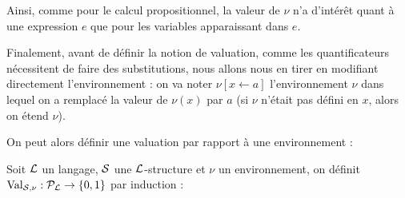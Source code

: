 Ainsi, comme pour le calcul propositionnel, la valeur de $\nu$ n'a d'intérêt quant à une expression $e$ que pour les variables apparaissant dans $e$.

Finalement, avant de définir la notion de valuation, comme les quantificateurs nécessitent de faire des substitutions, nous allons nous en tirer en modifiant directement l'environnement : on va noter $\nu[x \leftarrow a]$ l'environnement $\nu$ dans lequel on a remplacé la valeur de $\nu(x)$ par $a$ (si $\nu$ n'était pas défini en $x$, alors on étend $\nu$).

On peut alors définir une valuation par rapport à une environnement :

\begin{defi}[Valuation]
    Soit $\LL$ un langage, $\sS$ une $\LL$-structure et $\nu$ un environnement, on définit $\valu_{\sS,\nu} : \mathcal P_\LL \to \{0,1\}$ par induction :
    \begin{center}
        \begin{prooftree}
        \end{prooftree}
        \quad
        \begin{prooftree}
        \end{prooftree}
        \quad
        \begin{prooftree}
        \end{prooftree}
        \quad
        \begin{prooftree}
        \end{prooftree}
        \\
        \vspace{0.5cm}
        \begin{prooftree}
        \end{prooftree}
        \quad
        \begin{prooftree}
        \end{prooftree}

\end{center}
\end{defi}
